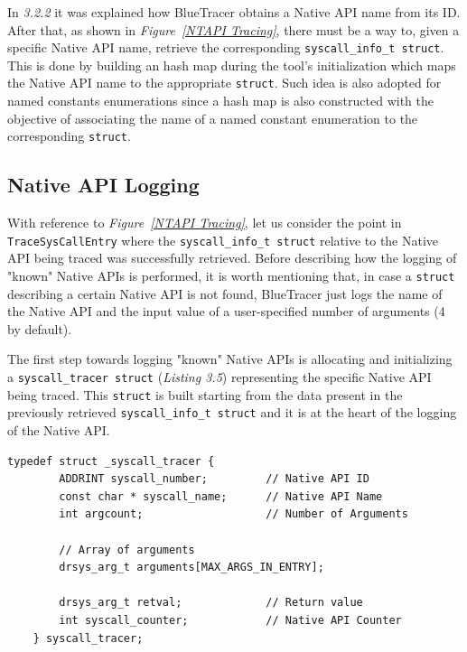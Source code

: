 In \textit{3.2.2} it was explained how BlueTracer obtains a Native API name from its ID. After that, as shown in \textit{Figure~\ref{NTAPI Tracing}}, there must be a way to, given a specific Native API name, retrieve the corresponding \texttt{syscall\_info\_t struct}. This is done by building an hash map during the tool's initialization which maps the Native API name to the appropriate \texttt{struct}. Such idea is also adopted for named constants enumerations since a hash map is also constructed with the objective of associating the name of a named constant enumeration to the corresponding \texttt{struct}.    

\subsection{Native API Logging}
With reference to \textit{Figure~\ref{NTAPI Tracing}}, let us consider the point in \texttt{TraceSysCallEntry} where the \texttt{syscall\_info\_t struct} relative to the Native API being traced was successfully retrieved. Before describing how the logging of "known" Native APIs is performed, it is worth mentioning that, in case a \texttt{struct} describing a certain Native API is not found, BlueTracer just logs the name of the Native API and the input value of a user-specified number of arguments (4 by default).

The first step towards logging "known" Native APIs is allocating and initializing a \texttt{syscall\_tracer struct} (\textit{Listing 3.5}) representing the specific Native API being traced. This \texttt{struct} is built starting from the data present in the previously retrieved  \texttt{syscall\_info\_t struct} and it is at the heart of the logging of the Native API.
\\
\begin{lstlisting}[caption={\texttt{struct} representing the Native API being traced},captionpos=b]
	typedef struct _syscall_tracer {
		ADDRINT syscall_number;			// Native API ID
		const char * syscall_name;		// Native API Name
		int argcount;				    // Number of Arguments

		// Array of arguments
		drsys_arg_t arguments[MAX_ARGS_IN_ENTRY];

		drsys_arg_t retval;			    // Return value
		int syscall_counter;			// Native API Counter
	} syscall_tracer;
\end{lstlisting}

